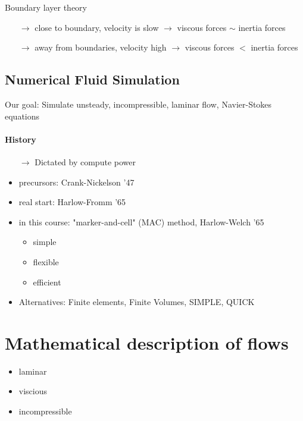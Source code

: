 \documentclass[a4paper,11pt]{scrartcl}
\begin{document}
Boundary layer theory
\begin{itemize}
	\item[$\rightarrow$] close to boundary, velocity is slow $\rightarrow$ viscous forces $\sim$ inertia forces
	\item[$\rightarrow$] away from boundaries, velocity high $\rightarrow$ viscous forces $<$ inertia forces
\end{itemize}

\subsection{Numerical Fluid Simulation}
Our goal: Simulate unsteady, incompressible, laminar flow, Navier-Stokes equations\\
\paragraph{History}
\begin{itemize}
	\item[$\rightarrow$] Dictated by compute power
	\item precursors: Crank-Nickelson '47
	\item real start: Harlow-Fromm '65
	\item in this course: "marker-and-cell" (MAC) method, Harlow-Welch '65
	\begin{itemize}
		\item simple
		\item flexible
		\item efficient
	\end{itemize}
	\item Alternatives: Finite elements, Finite Volumes, SIMPLE, QUICK
\end{itemize}

\section{Mathematical description of flows}
\begin{itemize}
	\item laminar
	\item viscious
	\item incompressible
\end{itemize}
\end{document}
